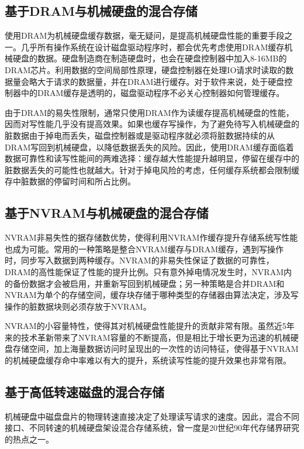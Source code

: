 \subsection{基于DRAM与机械硬盘的混合存储}

使用DRAM为机械硬盘缓存数据\cite{sdramcache2002}，毫无疑问，是提高机械硬盘性能的重要手段之一。几乎所有操作系统在设计磁盘驱动程序时，都会优先考虑使用DRAM缓存机械硬盘的数据。硬盘制造商在制造硬盘时，也会在硬盘控制器中加入8-16MB的DRAM芯片。利用数据的空间局部性原理，硬盘控制器在处理IO请求时读取的数据量会略大于请求的数据量，并在DRAM进行缓存。对于软件来说，处于硬盘控制器中的DRAM缓存是透明的，磁盘驱动程序不必关心控制器如何管理缓存。

由于DRAM的易失性限制，通常只使用DRAM作为读缓存提高机械硬盘的性能，因而对写性能几乎没有提高效果。如果也缓存写操作，为了避免待写入机械硬盘的脏数据由于掉电而丢失，磁盘控制器或是驱动程序就必须将脏数据持续的从DRAM写回到机械硬盘，以降低数据丢失的风险。因此，使用DRAM缓存面临着数据可靠性和读写性能间的两难选择：缓存越大性能提升越明显，停留在缓存中的脏数据丢失的可能性也就越大。针对于掉电风险的考虑，任何缓存系统都会限制缓存中脏数据的停留时间和所占比例。

\subsection{基于NVRAM与机械硬盘的混合存储}

NVRAM非易失性的据存储数优势，使得利用NVRAM作缓存提升存储系统写性能也成为可能。常用的一种策略是整合NVRAM缓存与DRAM缓存\cite{nvramcache2013}，遇到写操作时，同步写入数据到两种缓存。NVRAM的非易失性保证了数据的可靠性，DRAM的高性能保证了性能的提升比例。只有意外掉电情况发生时，NVRAM内的备份数据才会被启用，并重新写回到机械硬盘；另一种策略是合并DRAM和NVRAM为单个的存储空间，缓存块存储于哪种类型的存储器由算法决定，涉及写操作的脏数据块则必须存放于NVRAM。

NVRAM的小容量特性，使得其对机械硬盘性能提升的贡献非常有限。虽然近5年来的技术革新带来了NVRAM容量的不断提高，但是相比于增长更为迅速的机械硬盘存储空间，加上海量数据访问时呈现出的一次性的访问特征，使得基于NVRAM的机械硬盘缓存命中率难以有大的提升，系统读写性能的提升效果也非常有限。

\subsection{基于高低转速磁盘的混合存储}

机械硬盘中磁盘盘片的物理转速直接决定了处理读写请求的速度。因此，混合不同接口、不同转速的机械硬盘架设混合存储系统，曾一度是20世纪90年代存储界研究的热点之一。

